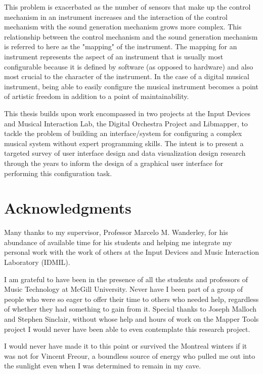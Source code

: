 \documentclass [12pt,letterpaper]{report}
\begin{document}
This problem is exacerbated as the number of sensors that make up the control mechanism in an instrument increases and the interaction of the control mechanism with the sound generation mechanism grows more complex. This relationship between the control mechanism and the sound generation mechanism is referred to here as the "mapping" of the instrument. The mapping for an instrument represents the aspect of an instrument that is usually most configurable because it is defined by software (as opposed to hardware) and also most crucial to the character of the instrument. In the case of a digital musical instrument, being able to easily configure the musical instrument becomes a point of artistic freedom in addition to a point of maintainability.

This thesis builds upon work encompassed in two projects at the Input Devices and Musical Interaction Lab, the Digital Orchestra Project and Libmapper, to tackle the problem of building an interface/system for configuring a complex musical system without expert programming skills. The intent is to present a targeted survey of user interface design and data visualization design research through the years to inform the design of a graphical user interface for performing this configuration task.

\newpage

\section*{\centering Acknowledgments}

Many thanks to my supervisor, Professor Marcelo M. Wanderley, for his abundance of available time for his students and helping me integrate my personal work with the work of others at the Input Devices and Music Interaction Laboratory (IDMIL).

I am grateful to have been in the presence of all the students and professors of Music Technology at McGill University. Never have I been part of a group of people who were so eager to offer their time to others who needed help, regardless of whether they had something to gain from it. Special thanks to Joseph Malloch and Stephen Sinclair, without whose help and hours of work on the Mapper Tools project I would never have been able to even contemplate this research project.

I would never have made it to this point or survived the Montreal winters if it was not for Vincent Freour, a boundless source of energy who pulled me out into the sunlight even when I was determined to remain in my cave.
\end{document}
